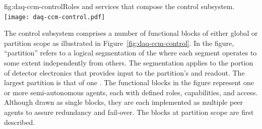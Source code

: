 
\begin{dunefigure}{fig:daq-ccm-control}{Roles and services that compose the  control subsystem.}
  \texttt{[image: daq-ccm-control.pdf]}
\end{dunefigure}

The control subsystem comprises a number of functional blocks of either global or partition scope as illustrated in Figure~\ref{fig:daq-ccm-control}. 
In the figure, ``partition'' refers to a logical segmentation of the  where each segment operates to some extent independently from others. 
The segmentation applies to the portion of detector electronics that provides input to the partition's  and readout. 
The largest partition %
is that of one . 
The functional blocks in the figure represent one or more semi-autonomous agents, each with defined roles, capabilities, and access. 
Although drawn as single blocks, they are each implemented as multiple peer agents to assure redundancy and fail-over. 
The blocks at partition scope are first described.

